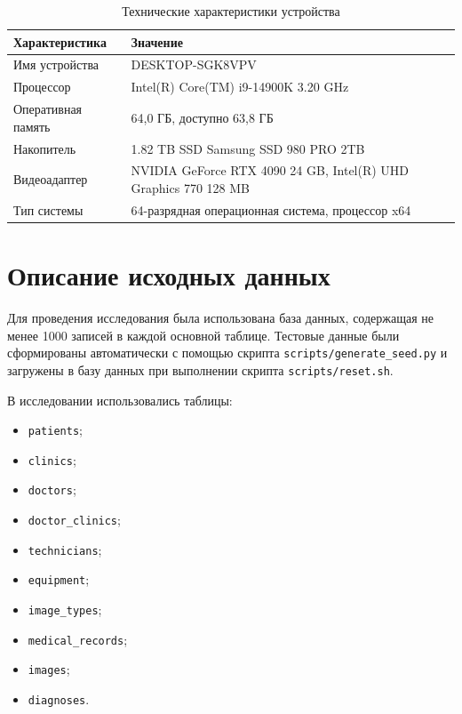 \begin{table}[H]
	\centering
	\caption{Технические характеристики устройства}
	\label{tbl:machine-specs}
	\small
	\begin{tabularx}{\textwidth}{|>{\raggedright\arraybackslash}p{}|X|}
		\hline
		\textbf{Характеристика} & \textbf{Значение} \\
		\hline
		Имя устройства & DESKTOP-SGK8VPV \\
		\hline
		Процессор & Intel(R) Core(TM) i9-14900K 3.20 GHz \\
		\hline
		Оперативная память & 64,0 ГБ, доступно 63,8 ГБ \\
		\hline
		Накопитель & 1.82 TB SSD Samsung SSD 980 PRO 2TB \\
		\hline
		Видеоадаптер & NVIDIA GeForce RTX 4090 24 GB, Intel(R) UHD Graphics 770 128 MB \\
		\hline
		Тип системы & 64-разрядная операционная система, процессор x64 \\
		\hline
	\end{tabularx}
\end{table}

\section{Описание исходных данных}

Для проведения исследования была использована база данных, содержащая не менее 1000 записей в каждой основной таблице. Тестовые данные были сформированы автоматически с помощью скрипта \texttt{scripts/generate\_seed.py} и загружены в базу данных при выполнении скрипта \texttt{scripts/reset.sh}.

В исследовании использовались таблицы:

\begin{itemize}
	\item \texttt{patients};
	\item \texttt{clinics};
	\item \texttt{doctors};
	\item \texttt{doctor\_clinics};
	\item \texttt{technicians};
	\item \texttt{equipment};
	\item \texttt{image\_types};
	\item \texttt{medical\_records};
	\item \texttt{images};
	\item \texttt{diagnoses}.
\end{itemize}

